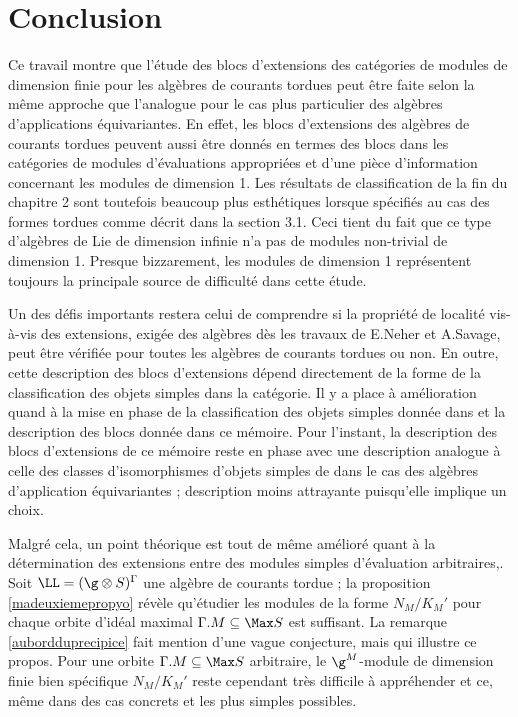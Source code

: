 \chapter*{Conclusion}         %

Ce travail montre que l'étude des blocs d'extensions des catégories de modules de dimension finie pour les algèbres de courants tordues peut être faite selon la même approche que l'analogue pour le cas plus particulier des algèbres d'applications équivariantes. En effet, les blocs d'extensions des algèbres de courants tordues peuvent aussi être donnés en termes des blocs dans les catégories de modules d'évaluations appropriées et d'une pièce d'information concernant les modules de dimension 1. Les résultats de classification de la fin du chapitre 2 sont toutefois beaucoup plus esthétiques lorsque spécifiés au cas des formes tordues comme décrit dans la section 3.1. Ceci tient du fait que ce type d'algèbres de Lie de dimension infinie n'a pas de modules non-trivial de dimension 1. Presque bizzarement, les modules de dimension 1 représentent toujours la principale source de difficulté dans cette étude.

Un des défis importants restera celui de comprendre si la propriété de localité vis-à-vis des extensions, exigée des algèbres dès les travaux de E.Neher et A.Savage, peut être vérifiée pour toutes les algèbres de courants tordues ou non. En outre, cette description des blocs d'extensions dépend directement de la forme de la classification des objets simples dans la catégorie. Il y a place à amélioration quand à la mise en phase de la classification des objets simples donnée dans \cite{LauTCA} et la description des blocs donnée dans ce mémoire. Pour l'instant, la description des blocs d'extensions de ce mémoire reste en phase avec une description analogue à celle des classes d'isomorphismes d'objets simples de \cite{NSSreps} dans le cas des algèbres d'application équivariantes ; description moins attrayante puisqu'elle implique un choix. 

Malgré cela, un point théorique est tout de même amélioré quant à la détermination des extensions entre des modules simples d'évaluation arbitraires,. Soit $\LL = (\g \otimes S)^\Gamma$ une algèbre de courants tordue ; la proposition \ref{madeuxiemepropyo} révèle qu'étudier les modules de la forme $N_M/K_M'$ pour chaque orbite d'idéal maximal $\Gamma.M \subseteq \Max S$ est suffisant. La remarque \ref{aubordduprecipice} fait mention d'une vague conjecture, mais qui illustre ce propos. Pour une orbite $\Gamma.M \subseteq \Max S$ arbitraire, le $\g^M$-module de dimension finie bien spécifique $N_M/K_M'$ reste cependant très difficile à appréhender et ce, même dans des cas concrets et les plus simples possibles.

